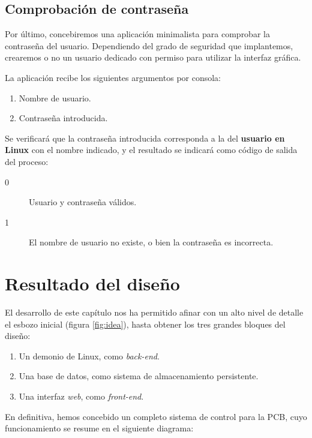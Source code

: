 \smallskip

\subsection{Comprobación de contraseña}
\label{subsec:applogin}

Por último, concebiremos una aplicación minimalista para comprobar la contraseña del usuario. Dependiendo del grado de seguridad que implantemos, crearemos o no un usuario dedicado con permiso para utilizar la interfaz gráfica.

La aplicación recibe los siguientes argumentos por consola:

\begin{enumerate}
	\item Nombre de usuario.
	\item Contraseña introducida.
\end{enumerate}

Se verificará que la contraseña introducida corresponda a la del \textbf{usuario en Linux} con el nombre indicado, y el resultado se indicará como código de salida del proceso:

\begin{description}
	\item[0] Usuario y contraseña válidos.
	\item[1] El nombre de usuario no existe, o bien la contraseña es incorrecta.
\end{description}

\newpage

\section{Resultado del diseño}

El desarrollo de este capítulo nos ha permitido afinar con un alto nivel de detalle el esbozo inicial (figura \ref{fig:idea}), hasta obtener los tres grandes bloques del diseño:

\begin{enumerate}
	\item Un demonio de Linux, como \textit{back-end}.
	\item Una base de datos, como sistema de almacenamiento persistente.
	\item Una interfaz \textit{web}, como \textit{front-end}.
\end{enumerate}

En definitiva, hemos concebido un completo sistema de control para la \acrshort{PCB}, cuyo funcionamiento se resume en el siguiente diagrama:

